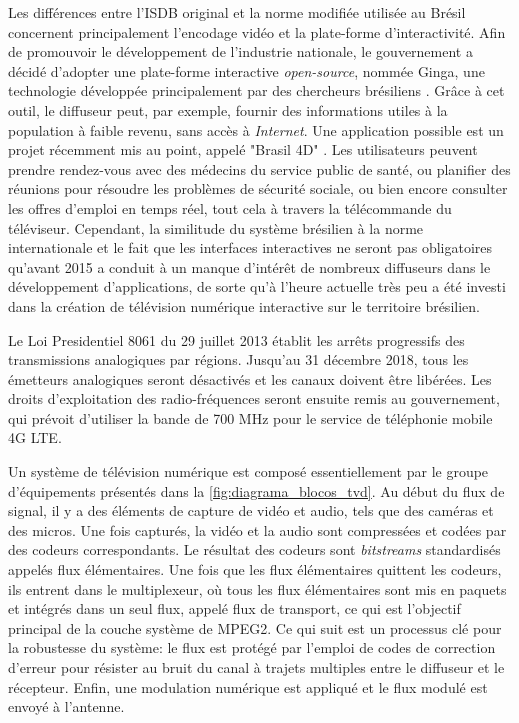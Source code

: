 \documentclass[12pt,a4paper]{article}
\begin{document}
Les différences entre l'ISDB original et la norme modifiée utilisée au Brésil concernent principalement l'encodage vidéo et la plate-forme d'interactivité. Afin de promouvoir le développement de l'industrie nationale, le gouvernement a décidé d'adopter une plate-forme interactive \textit{open-source}, nommée Ginga, une technologie développée principalement par des chercheurs brésiliens \cite{PUCRJ}. Grâce à cet outil, le diffuseur peut, par exemple, fournir des informations utiles à la population à faible revenu, sans accès à \textit{Internet}. Une application possible est un projet récemment mis au point, appelé "Brasil 4D" \cite{consultas}. Les utilisateurs peuvent prendre rendez-vous avec des médecins du service public de santé, ou planifier des réunions pour résoudre les problèmes de sécurité sociale, ou bien encore consulter les offres d'emploi en temps réel, tout cela à travers la télécommande du téléviseur. Cependant, la similitude du système brésilien à la norme internationale et le fait que les interfaces interactives ne seront pas obligatoires qu'avant 2015 a conduit à un manque d'intérêt de nombreux diffuseurs dans le développement d'applications, de sorte qu'à l'heure actuelle très peu a été investi dans la création de télévision numérique interactive sur le territoire brésilien.

Le Loi Presidentiel 8061 \cite{decreto8061} du 29 juillet 2013 établit les arrêts progressifs des transmissions analogiques par régions. Jusqu'au 31 décembre 2018, tous les émetteurs analogiques seront désactivés et les canaux doivent être libérées. Les droits d'exploitation des radio-fréquences seront ensuite remis au gouvernement, qui prévoit d'utiliser la bande de 700 MHz pour le service de téléphonie mobile 4G LTE.

Un système de télévision numérique est composé essentiellement par le groupe d'équipements présentés dans la \autoref{fig:diagrama_blocos_tvd}. Au début du flux de signal, il y a des éléments de capture de vidéo et audio, tels que des caméras et des micros. Une fois capturés, la vidéo et la audio sont compressées et codées par des codeurs correspondants. Le résultat des codeurs sont \textit{bitstreams} standardisés appelés flux élémentaires. Une fois que les flux élémentaires quittent les codeurs, ils entrent dans le multiplexeur, où tous les flux élémentaires sont mis en paquets et intégrés dans un seul flux, appelé flux de transport, ce qui est l'objectif principal de la couche système de MPEG2. Ce qui suit est un processus clé pour la robustesse du système: le flux est protégé par l'emploi de codes de correction d'erreur pour résister au bruit du canal à trajets multiples entre le diffuseur et le récepteur. Enfin, une modulation numérique est appliqué et le flux modulé est envoyé à l'antenne.
\end{document}
